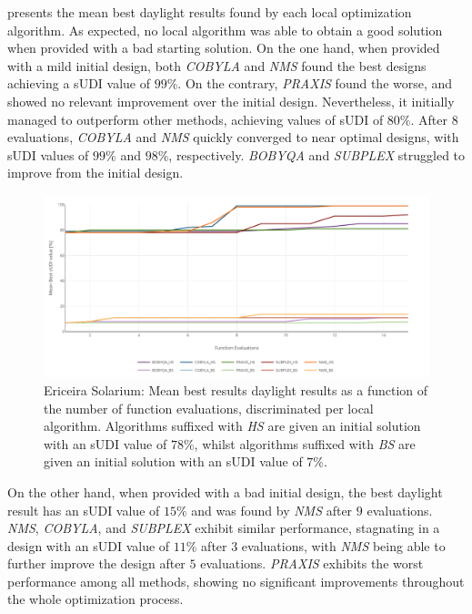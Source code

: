 presents the mean best daylight results found by each local optimization algorithm. As expected, no local algorithm was able to obtain a good solution when provided with a bad starting solution. On the one hand, when provided with a mild initial design, both \textit{\ac{COBYLA}} and \textit{\ac{NMS}} found the best designs achieving a \ac{sUDI} value of $99\%$. On the contrary, \textit{\ac{PRAXIS}} found the worse, and showed no relevant improvement over the initial design. Nevertheless, it initially managed to outperform other methods, achieving values of \ac{sUDI} of $80\%$. After $8$ evaluations, \textit{\ac{COBYLA}} and \textit{\ac{NMS}} quickly converged to near optimal designs, with \ac{sUDI} values of $99\%$ and $98\%$, respectively. \textit{\ac{BOBYQA}} and \textit{SUBPLEX} struggled to improve from the initial design.
\begin{figure}[htbp]
	\centering
	\includegraphics[width=\textwidth]{Images/Evaluation/Ericeira_results_ph2.PNG}
	\caption[Ericeira Solarium: Mean best results of daylight performance in function of the number of evaluations, discriminated per local algorithm]{Ericeira Solarium: Mean best results daylight results as a function of the number of function evaluations, discriminated per local algorithm. Algorithms suffixed with \textit{HS} are given an initial solution with an \ac{sUDI} value of $78\%$, whilst algorithms suffixed with \textit{BS} are given an initial solution with an \ac{sUDI} value of $7\%$.}
	\label{fig:phase2results}
\end{figure}

On the other hand, when provided with a bad initial design, the best daylight result has an \ac{sUDI} value of $15\%$ and was found by \textit{\ac{NMS}} after $9$ evaluations. \textit{\ac{NMS}}, \textit{\ac{COBYLA}}, and \textit{SUBPLEX} exhibit similar performance, stagnating in a design with an \ac{sUDI} value of $11\%$ after $3$ evaluations, with \textit{\ac{NMS}} being able to further improve the design after $5$ evaluations. \textit{\ac{PRAXIS}} exhibits the worst performance among all methods, showing no significant improvements throughout the whole optimization process.



